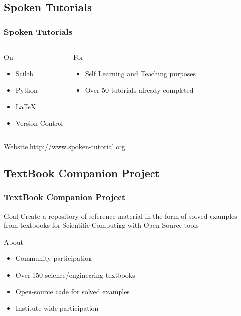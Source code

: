 \documentclass[compress,red]{beamer} %
\begin{document}
\subsection{Spoken Tutorials}
\begin{frame}
\frametitle{Spoken Tutorials}
\begin{columns}
\begin{block}{On}
\begin{itemize}
\item Scilab \pause
\item Python \pause
\item \LaTeX \pause
\item Version Control \pause
\end{itemize}
\end{block}
\begin{block}{For}
\begin{itemize}
\item Self Learning and Teaching purposes \pause
\item Over \alert{50} tutorials already completed  
\end{itemize}
\end{block}
\pause
\end{columns}
\begin{block}{Website}
http://www.spoken-tutorial.org
\end{block}
\end{frame}


\subsection{TextBook Companion Project}

\begin{frame}
\frametitle{TextBook Companion Project}
\begin{block}{Goal}
Create a repository of reference material in the form of solved examples from textbooks for Scientific Computing with Open Source tools \pause
\end{block}
\begin{block}{About}
\begin{itemize}
	\item Community participation \pause
    \item Over 150 science/engineering textbooks \pause
    \item Open-source code for solved examples \pause
    \item \alert{Institute-wide participation}
\end{itemize}
\end{block}
\end{frame}
\end{document}
